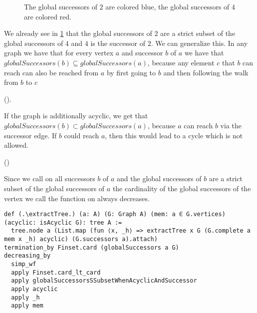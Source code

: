 \begin{figure}
    \centering
      \caption{The global successors of $2$ are colored blue, the global successors of $4$ are colored red.}
      \label{fig:globalSuccessors}
\end{figure}

We already see in \cref{fig:globalSuccessors} that the global successors of $2$ are a strict subset of the global successors of $4$ and $4$ is the successor of $2$. We can generalize this. In any graph we have that for every vertex $a$ and successor $b$ of $a$ we have that $globalSuccessors(b) \subseteq globalSuccessors(a)$, because any element $c$ that $b$ can reach can also be reached from $a$ by first going to $b$ and then following the walk from $b$ to $c$

(\globalSuccessorsSubsetWhenSuccessor).


If the graph is additionally acyclic, we get that $globalSuccessors(b) \subset globalSuccessors(a)$, because $a$ can reach $b$ via the successor edge. If $b$ could reach $a$, then this would lead to a cycle which is not allowed.

(\globalSuccessorsSSubsetWhenAcyclicAndSuccessor)

Since we call \extractTree on all successors $b$ of $a$ and the global successors of $b$ are a strict subset of the global successors of $a$ the cardinality of the global successors of the vertex we call the function on always decreases.

\begin{lstlisting}
def (.\extractTree.) (a: A) (G: Graph A) (mem: a ∈ G.vertices) (acyclic: isAcyclic G): tree A :=
  tree.node a (List.map (fun ⟨x, _h⟩ => extractTree x G (G.complete a mem x _h) acyclic) (G.successors a).attach)
termination_by Finset.card (globalSuccessors a G)
decreasing_by
  simp_wf
  apply Finset.card_lt_card
  apply globalSuccessorsSSubsetWhenAcyclicAndSuccessor
  apply acyclic
  apply _h
  apply mem
\end{lstlisting}

